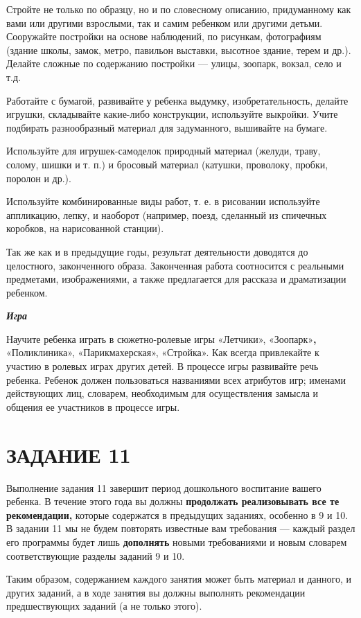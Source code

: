 \documentclass[a5paper]{book}
\renewcommand{\emph}[1]{\textit{#1}}
\begin{document}
Стройте не только по образцу, но и по словесному описанию, придуманному
как вами или другими взрослыми, так и самим ребенком или другими детьми.
Сооружайте постройки на основе наблюдений, по рисункам, фотографиям
(здание школы, замок, метро, павильон выставки, высотное здание, терем и
др.). Делайте сложные по содержанию постройки --- улицы, зоопарк,
вокзал, село и т.д.

Работайте с бумагой, развивайте у ребенка выдумку, изобретательность,
делайте игрушки, складывайте какие-либо конструкции, используйте
выкройки. Учите подбирать разнообразный материал для задуманного,
вышивайте на бумаге.

Используйте для игрушек-самоделок природный материал (желуди, траву,
солому, шишки и т. п.) и бросовый материал (катушки, проволоку, пробки,
поролон и др.).

Используйте комбинированные виды работ, т. е. в рисовании используйте
аппликацию, лепку, и наоборот (например, поезд, сделанный из спичечных
коробков, на нарисованной станции).

Так же как и в предыдущие годы, результат деятельности доводятся до
целостного, законченного образа. Законченная работа соотносится с
реальными предметами, изображениями, а также предлагается для рассказа и
драматизации ребенком.

\emph{\textbf{Игра}}

Научите ребенка играть в сюжетно-ролевые игры «Летчики»,
«Зоопарк»\textbf{,} «Поликлиника», «Парикмахерская», «Стройка». Как
всегда привлекайте к участию в ролевых играх других детей. В процессе
игры развивайте речь ребенка. Ребенок должен пользоваться названиями
всех атрибутов игр; именами действующих лиц, словарем, необходимым для
осуществления замысла и общения ее участников в процессе игры.

\section{ЗАДАНИЕ 11}

Выполнение задания 11 завершит период дошкольного воспитание вашего
ребенка. В течение этого года вы должны \textbf{продолжать реализовывать
все те рекомендации,} которые содержатся в предыдущих заданиях, особенно
в 9 и 10. В задании 11 мы не будем повторять известные вам требования
--- каждый раздел его программы будет лишь \textbf{дополнять} новыми
требованиями и новым словарем соответствующие разделы заданий 9 и 10.

Таким образом, содержанием каждого занятия может быть материал и
данного, и других заданий, а в ходе занятия вы должны выполнять
рекомендации предшествующих заданий (а не только этого).
\end{document}

